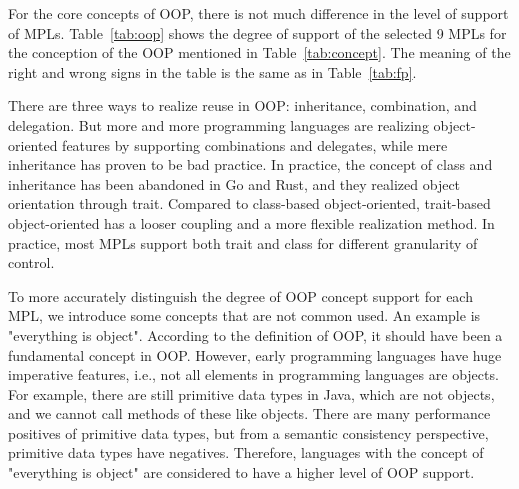 
For the core concepts of OOP, there is not much difference in the level of support of MPLs.
Table~\ref{tab:oop} shows the degree of support of the selected 9 MPLs for the conception of the OOP
mentioned in Table~\ref{tab:concept}.
The meaning of the right and wrong signs in the table is the same as in Table~\ref{tab:fp}.

There are three ways to realize reuse in OOP: inheritance, combination, and delegation.
But more and more programming languages are realizing object-oriented
features by supporting combinations and delegates, while mere
inheritance has proven to be bad practice\cite{gamma1995design}.
In practice, the concept of class and inheritance has been abandoned in Go and Rust,
and they realized object orientation through trait.
Compared to class-based object-oriented, trait-based object-oriented has a looser coupling
and a more flexible realization method.
In practice, most MPLs support both trait and class for different granularity of control.

To more accurately distinguish the degree of OOP concept support for each MPL,
we introduce some concepts that are not common used.
An example is "everything is object".
According to the definition of OOP, it should have been a fundamental concept in OOP\@.
However, early programming languages have huge imperative features, i.e.,
not all elements in programming languages are objects.
For example, there are still primitive data types in Java, which are not objects,
and we cannot call methods of these like objects.
There are many performance positives of primitive data types,
but from a semantic consistency perspective, primitive data types have negatives.
Therefore, languages with the concept of "everything is object" are
considered to have a higher level of OOP support.


